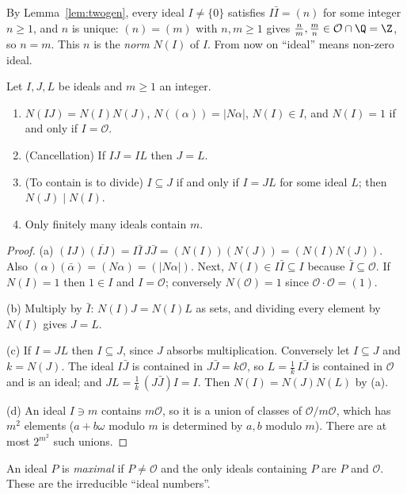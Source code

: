 By Lemma~\ref{lem:twogen}, every ideal $I\ne\{0\}$ satisfies $I\bar I=(n)$ for some integer $n\ge1$, and $n$ is unique: $(n)=(m)$ with $n,m\ge1$ gives $\frac nm,\frac mn\in\mathcal O\cap\Q=\Z$, so $n=m$. This $n$ is the \emph{norm} $N(I)$ of $I$. From now on ``ideal'' means non-zero ideal.

\begin{proposition}\label{prop:idealrules}
Let $I,J,L$ be ideals and $m\ge1$ an integer.
\begin{enumerate}[label=(\alph*)]
\item $N(IJ)=N(I)N(J)$, $N((\alpha))=|N\alpha|$, $N(I)\in I$, and $N(I)=1$ if and only if $I=\mathcal O$.
\item (Cancellation) If $IJ=IL$ then $J=L$.
\item (To contain is to divide) $I\subseteq J$ if and only if $I=JL$ for some ideal $L$; then $N(J)\mid N(I)$.
\item Only finitely many ideals contain $m$.
\end{enumerate}
\end{proposition}
\begin{proof}
(a) $(IJ)\overline{(IJ)}=I\bar I\,J\bar J=(N(I))(N(J))=(N(I)N(J))$. Also $(\alpha)(\bar\alpha)=(N\alpha)=(|N\alpha|)$. Next, $N(I)\in I\bar I\subseteq I$ because $\bar I\subseteq\mathcal O$. If $N(I)=1$ then $1\in I$ and $I=\mathcal O$; conversely $N(\mathcal O)=1$ since $\mathcal O\cdot\mathcal O=(1)$.

(b) Multiply by $\bar I$: $N(I)J=N(I)L$ as sets, and dividing every element by $N(I)$ gives $J=L$.

(c) If $I=JL$ then $I\subseteq J$, since $J$ absorbs multiplication. Conversely let $I\subseteq J$ and $k=N(J)$. The ideal $I\bar J$ is contained in $J\bar J=k\mathcal O$, so $L=\frac1k\,I\bar J$ is contained in $\mathcal O$ and is an ideal; and $JL=\frac1k\,(J\bar J)I=I$. Then $N(I)=N(J)N(L)$ by (a).

(d) An ideal $I\ni m$ contains $m\mathcal O$, so it is a union of classes of $\mathcal O/m\mathcal O$, which has $m^2$ elements ($a+b\omega$ modulo $m$ is determined by $a,b$ modulo $m$). There are at most $2^{m^2}$ such unions.
\end{proof}

An ideal $P$ is \emph{maximal} if $P\ne\mathcal O$ and the only ideals containing $P$ are $P$ and $\mathcal O$. These are the irreducible ``ideal numbers''.

